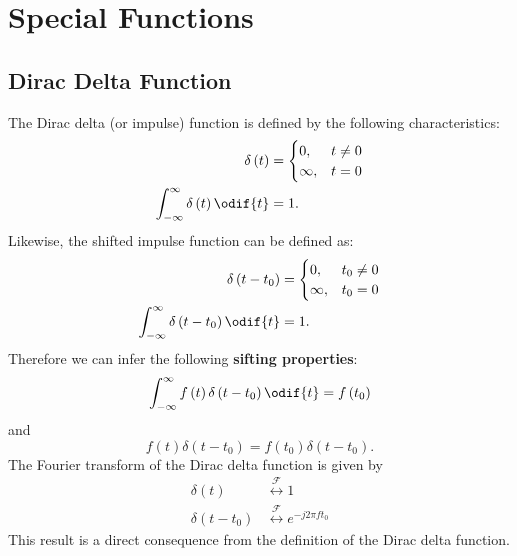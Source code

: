 \documentclass{article}
\begin{document}
\section{Special Functions}
\subsection{Dirac Delta Function}
The Dirac delta (or impulse) function is defined by the following characteristics:
\begin{align*}
    \delta\left( t \right)                                & = \begin{cases}
                                                                  0,      & t \neq 0 \\
                                                                  \infty, & t = 0
                                                              \end{cases} \\
    \int_{-\infty}^\infty \delta\left( t \right) \odif{t} & = 1.
\end{align*}
Likewise, the shifted impulse function can be defined as:
\begin{align*}
    \delta\left( t - t_0 \right)                                & = \begin{cases}
                                                                        0,      & t_0 \neq 0 \\
                                                                        \infty, & t_0 = 0
                                                                    \end{cases} \\
    \int_{-\infty}^\infty \delta\left( t - t_0 \right) \odif{t} & = 1.
\end{align*}
Therefore we can infer the following \textbf{sifting properties}:
\begin{equation*}
    \int_{-\infty}^\infty f\left( t \right) \delta\left( t - t_0 \right) \odif{t} = f\left( t_0 \right)
\end{equation*}
and
\begin{equation*}
    f\left( t \right) \delta\left( t - t_0 \right) = f\left( t_0 \right) \delta\left( t - t_0 \right).
\end{equation*}
The Fourier transform of the Dirac delta function is given by
\begin{align*}
    \delta\left( t \right)       & \overset{\mathscr{F}}{\longleftrightarrow} 1                 \\
    \delta\left( t - t_0 \right) & \overset{\mathscr{F}}{\longleftrightarrow} e^{-j 2\pi f t_0}
\end{align*}
This result is a direct consequence from the definition of the Dirac delta function.
\end{document}
